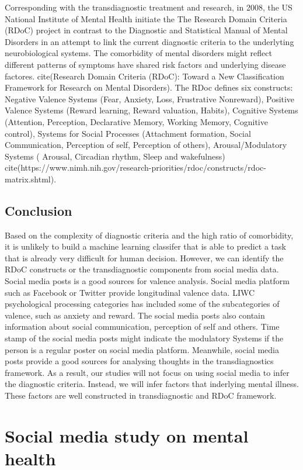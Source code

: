 Corresponding with the transdiagnostic treatment and research, in 2008, the US National Institute of Mental Health initiate the The Research Domain Criteria (RDoC) project in contrast to the  Diagnostic and Statistical Manual of Mental Disorders in an attempt to link the current diagnostic criteria to the underlyting neurobiological systems. The comorbidity of mental disorders might reflect different patterns of symptoms have shared risk factors and underlying disease factores. cite(Research Domain Criteria (RDoC): Toward a New Classification Framework for Research on Mental Disorders). The RDoc defines six constructs: Negative Valence Systems (Fear, Anxiety, Loss, Frustrative Nonreward), Positive Valence Systems (Reward learning, Reward valuation, Habits), Cognitive Systems (Attention, Perception, Declarative Memory, Working Memory, Cognitive control), Systems for Social Processes (Attachment formation, Social Communication, Perception of self, Perception of others), Arousal/Modulatory Systems (
Arousal, Circadian rhythm, Sleep and wakefulness) cite(https://www.nimh.nih.gov/research-priorities/rdoc/constructs/rdoc-matrix.shtml). 


\subsection{Conclusion}
Based on the complexity of diagnostic criteria and the high ratio of comorbidity, it is unlikely to build a machine learning classifer that is able to predict a task that is already very difficult for human decision. However, we can identify the RDoC constructs or the transdiagnostic components from social media data. Social media posts is a good sources for valence analysis. Social media platform such as Facebook or Twitter provide longitudinal valence data. LIWC psychological processing categories has included some of the subcategories of valence, such as anxiety and reward. The social media posts also contain information about social communication, perception of self and others. Time stamp of the social media posts might indicate the modulatory Systems if the person is a regular poster on social media platform. Meanwhile, social media posts provide a good sources for analysing thoughts in the transdiagnostics framework. As a result, our studies will not focus on using social media to infer the diagnostic criteria. Instead, we will infer factors that inderlying mental illness. These factors are well constructed in transdiagnostic and RDoC framework.


\section{Social media study on mental health}


